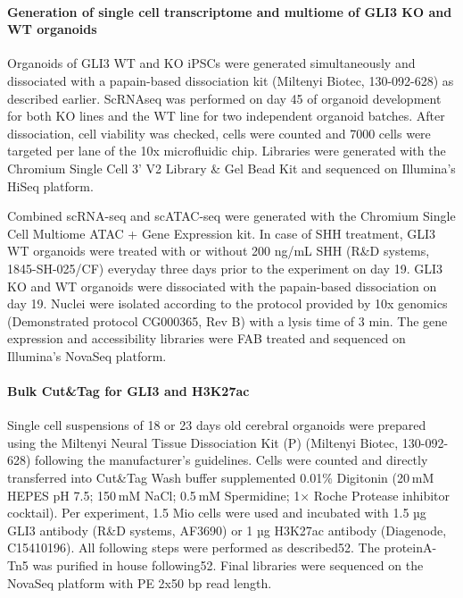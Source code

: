\paragraph{Generation of single cell transcriptome and multiome of GLI3 KO and WT organoids}
Organoids of GLI3 WT and KO iPSCs were generated simultaneously and dissociated with a papain-based dissociation kit (Miltenyi Biotec, 130-092-628) as described earlier. ScRNAseq was performed on day 45 of organoid development for both KO lines and the WT line for two independent organoid batches. After dissociation, cell viability was checked, cells were counted and 7000 cells were targeted per lane of the 10x microfluidic chip. Libraries were generated with the Chromium Single Cell 3’ V2 Library \& Gel Bead Kit and sequenced on Illumina’s HiSeq platform.

Combined scRNA-seq and scATAC-seq were generated with the Chromium Single Cell Multiome ATAC + Gene Expression kit. In case of SHH treatment, GLI3 WT organoids were treated with or without 200 ng/mL SHH (R\&D systems, 1845-SH-025/CF) everyday three days prior to the experiment on day 19. GLI3 KO and WT organoids were dissociated with the papain-based dissociation on day 19. Nuclei were isolated according to the protocol provided by 10x genomics (Demonstrated protocol CG000365, Rev B) with a lysis time of 3 min. The gene expression and accessibility libraries were FAB treated and sequenced on Illumina’s NovaSeq platform.
 
\paragraph{Bulk Cut\&Tag for GLI3 and H3K27ac}
Single cell suspensions of 18 or 23 days old cerebral organoids were prepared using the Miltenyi Neural Tissue Dissociation Kit (P) (Miltenyi Biotec, 130-092-628) following the manufacturer’s guidelines. Cells were counted and directly transferred into Cut\&Tag Wash buffer supplemented 0.01\% Digitonin (20 mM HEPES pH 7.5; 150 mM NaCl; 0.5 mM Spermidine; 1× Roche Protease inhibitor cocktail). Per experiment, 1.5 Mio cells were used and incubated with 1.5 µg GLI3 antibody (R\&D systems, AF3690) or 1 µg H3K27ac antibody (Diagenode, C15410196). All following steps were performed as described52. The proteinA-Tn5 was purified in house following52. Final libraries were sequenced on the NovaSeq platform with PE 2x50 bp read length.
 


